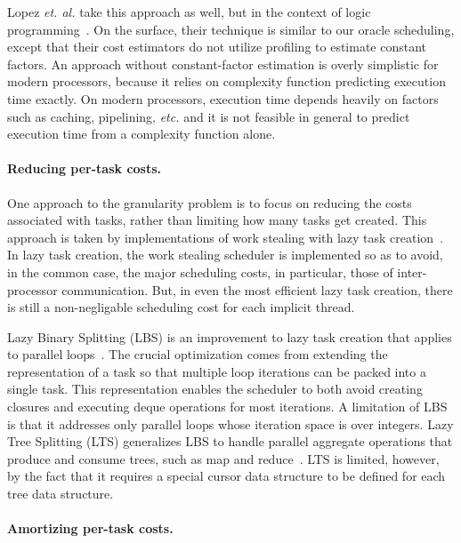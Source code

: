 Lopez \textit{et. al.} take this approach as well, but in the context
of logic programming~\cite{Lopez:1996:MGC:241129.241165}. On the
surface, their technique is similar to our oracle scheduling, except
that their cost estimators do not utilize profiling to estimate
constant factors. An approach without constant-factor estimation is
overly simplistic for modern processors, because it relies on
complexity function predicting execution time exactly. On modern
processors, execution time depends heavily on factors such as caching,
pipelining, \textit{etc.} and it is not feasible in general to predict
execution time from a complexity function alone.

\paragraph{Reducing per-task costs.}

One approach to the granularity problem is to focus on reducing
the costs associated with tasks, rather than limiting how many tasks
get created. This approach is taken by implementations of work
stealing with lazy task
creation~\cite{lazy-task-creation,message-passing-ltc,FrigoLeRa98,
  rainey:phd,backtracking-based-load-balancing,SanchezADM}. In lazy
task creation, the work stealing scheduler is implemented so as to
avoid, in the common case, the major scheduling costs, in particular,
those of inter-processor communication. But, in even the most
efficient lazy task creation, there is still a non-negligable
scheduling cost for each implicit thread.

Lazy Binary Splitting (LBS) is an improvement to lazy task creation
that applies to parallel loops~\cite{lazy-binary-splitting}. The
crucial optimization comes from extending the representation of a task
so that multiple loop iterations can be packed into a single
task. This representation enables the scheduler to both avoid creating
closures and executing deque operations for most iterations.
A limitation of LBS is that it addresses only parallel loops whose
iteration space is over integers.  Lazy Tree Splitting (LTS)
generalizes LBS to handle parallel aggregate operations that produce
and consume trees, such as map and
reduce~\cite{BergstromFlRaReSh10}. LTS is limited, however, by the
fact that it requires a special cursor data structure to be defined
for each tree data structure.

\paragraph{Amortizing per-task costs.}


